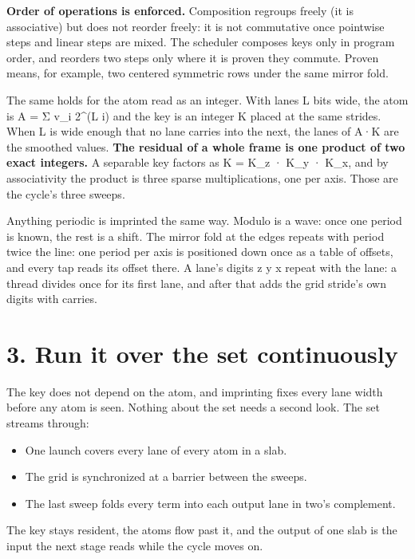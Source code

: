\textbf{Order of operations is enforced.} Composition regroups freely (it is associative) but does not reorder freely: it is not commutative once pointwise steps and linear steps are mixed. The scheduler composes keys only in program order, and reorders two steps only where it is proven they commute. Proven means, for example, two centered symmetric rows under the same mirror fold.

The same holds for the atom read as an integer. With lanes L bits wide, the atom is A = Σ v\_\allowbreak{}i 2\textasciicircum{}(L i) and the key is an integer K placed at the same strides. When L is wide enough that no lane carries into the next, the lanes of A·K are the smoothed values. \textbf{The residual of a whole frame is one product of two exact integers.} A separable key factors as K = K\_\allowbreak{}z · K\_\allowbreak{}y · K\_\allowbreak{}x, and by associativity the product is three sparse multiplications, one per axis. Those are the cycle's three sweeps.

Anything periodic is imprinted the same way. Modulo is a wave: once one period is known, the rest is a shift. The mirror fold at the edges repeats with period twice the line: one period per axis is positioned down once as a table of offsets, and every tap reads its offset there. A lane's digits z y x repeat with the lane: a thread divides once for its first lane, and after that adds the grid stride's own digits with carries.

\section{\texorpdfstring{3. Run it over the set continuously}{3. Run it over the set continuously}}

The key does not depend on the atom, and imprinting fixes every lane width before any atom is seen. Nothing about the set needs a second look. The set streams through:

\begin{itemize}
\item One launch covers every lane of every atom in a slab.
\item The grid is synchronized at a barrier between the sweeps.
\item The last sweep folds every term into each output lane in two's complement.
\end{itemize}

The key stays resident, the atoms flow past it, and the output of one slab is the input the next stage reads while the cycle moves on.

